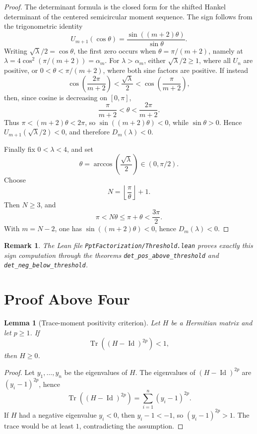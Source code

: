 \documentclass[11pt,reqno]{amsart}
\newtheorem{lemma}[theorem]{Lemma}
\newtheorem{remark}[theorem]{Remark}
\newcommand{\Tr}{\operatorname{Tr}}
\newcommand{\Id}{\operatorname{Id}}
\begin{document}
\begin{proof}
The determinant formula is the closed form for the shifted Hankel determinant
of the centered semicircular moment sequence.  The sign follows from the
trigonometric identity
\[
  U_{m+1}(\cos\theta)=\frac{\sin((m+2)\theta)}{\sin\theta}.
\]
Writing \(\sqrt\lambda/2=\cos\theta\), the first zero occurs when
\(\theta=\pi/(m+2)\), namely at
\(\lambda=4\cos^2(\pi/(m+2))=\alpha_m\).  For
\(\lambda>\alpha_m\), either \(\sqrt\lambda/2\ge1\), where all \(U_n\) are
positive, or \(0<\theta<\pi/(m+2)\), where both sine factors are positive.
If instead
\[
  \cos\left(\frac{2\pi}{m+2}\right)
  <
  \frac{\sqrt\lambda}{2}
  <
  \cos\left(\frac{\pi}{m+2}\right),
\]
then, since cosine is decreasing on \([0,\pi]\),
\[
  \frac{\pi}{m+2}<\theta<\frac{2\pi}{m+2}.
\]
Thus \(\pi<(m+2)\theta<2\pi\), so
\(\sin((m+2)\theta)<0\), while \(\sin\theta>0\).  Hence
\(U_{m+1}(\sqrt\lambda/2)<0\), and therefore \(D_m(\lambda)<0\).

Finally fix \(0<\lambda<4\), and set
\[
  \theta=\arccos\left(\frac{\sqrt\lambda}{2}\right)\in(0,\pi/2).
\]
Choose
\[
  N=\left\lfloor\frac{\pi}{\theta}\right\rfloor+1.
\]
Then \(N\ge3\), and
\[
  \pi<N\theta\le \pi+\theta<\frac{3\pi}{2}.
\]
With \(m=N-2\), one has \(\sin((m+2)\theta)<0\), hence
\(D_m(\lambda)<0\).
\end{proof}

\begin{remark}
The Lean file \texttt{PptFactorization/Threshold.lean} proves exactly this
sign computation through the theorems
\texttt{det\_pos\_above\_threshold} and
\texttt{det\_neg\_below\_threshold}.
\end{remark}

\section{Proof Above Four}

\begin{lemma}[Trace-moment positivity criterion]
\label{lem:trace-moment-positivity}
Let \(H\) be a Hermitian matrix and let \(p\ge1\).  If
\[
  \Tr\left((H-\Id)^{2p}\right)<1,
\]
then \(H\ge0\).
\end{lemma}

\begin{proof}
Let \(y_1,\ldots,y_n\) be the eigenvalues of \(H\).  The eigenvalues of
\((H-\Id)^{2p}\) are \((y_i-1)^{2p}\), hence
\[
  \Tr\left((H-\Id)^{2p}\right)=\sum_{i=1}^n (y_i-1)^{2p}.
\]
If \(H\) had a negative eigenvalue \(y_i<0\), then \(y_i-1<-1\), so
\((y_i-1)^{2p}>1\).  The trace would be at least \(1\), contradicting the
assumption.
\end{proof}
\end{document}
